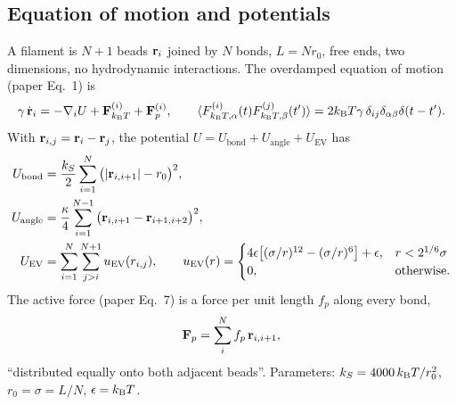 \documentclass[11pt]{article}
\begin{document}
\subsection{Equation of motion and potentials}
A filament is $N+1$ beads $\mathbf{r}_i$ joined by $N$ bonds, $L=Nr_0$, free ends, two dimensions, no
hydrodynamic interactions. The overdamped equation of motion (paper Eq.~1) is
\begin{equation}
\gamma\,\dot{\mathbf{r}}_i = -\nabla_i U + \mathbf{F}^{(i)}_{k_{\mathrm{B}}T} + \mathbf{F}^{(i)}_p ,
\qquad \langle F^{(i)}_{k_{\mathrm{B}}T,\alpha}(t)F^{(j)}_{k_{\mathrm{B}}T,\beta}(t')\rangle=2k_{\mathrm{B}}T\gamma\,\delta_{ij}\delta_{\alpha\beta}\delta(t-t').
\end{equation}
With $\mathbf{r}_{i,j}=\mathbf{r}_i-\mathbf{r}_j$, the potential $U=U_\mathrm{bond}+U_\mathrm{angle}+U_\mathrm{EV}$ has
\begin{align}
U_\mathrm{bond} &= \frac{k_S}{2}\sum_{i=1}^{N}\big(|\mathbf{r}_{i,i+1}|-r_0\big)^2, \label{eq:bond}\\
U_\mathrm{angle} &= \frac{\kappa}{4}\sum_{i=1}^{N-1}\big(\mathbf{r}_{i,i+1}-\mathbf{r}_{i+1,i+2}\big)^2, \label{eq:bend}\\
U_\mathrm{EV} &= \sum_{i=1}^{N}\sum_{j>i}^{N+1} u_\mathrm{EV}(r_{i,j}),\qquad
u_\mathrm{EV}(r)=\begin{cases}4\epsilon\big[(\sigma/r)^{12}-(\sigma/r)^6\big]+\epsilon,& r<2^{1/6}\sigma\\0,&\text{otherwise.}\end{cases}\label{eq:wca}
\end{align}
The active force (paper Eq.~7) is a force per unit length $f_p$ along every bond,
\begin{equation}
\mathbf{F}_p=\sum_{i}^{N} f_p\,\mathbf{r}_{i,i+1},\label{eq:prop}
\end{equation}
``distributed equally onto both adjacent beads''. Parameters: $k_S=4000\,k_{\mathrm{B}}T/r_0^2$, $r_0=\sigma=L/N$, $\epsilon=k_{\mathrm{B}}T$.
\end{document}
